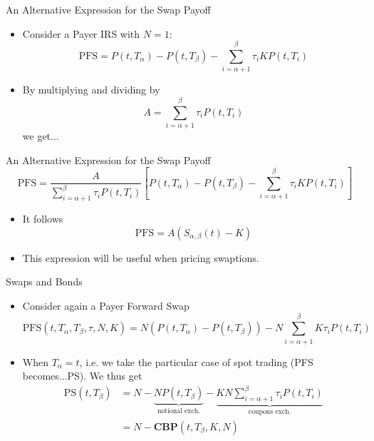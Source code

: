 \documentclass{beamer}
\begin{document}
\begin{frame}{An Alternative Expression for the Swap Payoff}
	\begin{itemize}
		\item Consider a Payer IRS with $N=1$:
		\begin{equation*}
			\text{PFS} = P(t,T_\alpha)-P(t,T_\beta)-\sum_{i=\alpha+1}^{\beta}\tau_iKP(t,T_i)
		\end{equation*}
		\item By multiplying and dividing by
		\begin{equation}
			A = \sum_{i=\alpha+1}^{\beta}\tau_iP(t, T_i)
		\end{equation}
		we get...
	\end{itemize}
\end{frame}

\begin{frame}{An Alternative Expression for the Swap Payoff}
	\begin{equation*}
		\text{PFS}=\frac{A}{\sum_{i=\alpha+1}^{\beta}\tau_iP(t, T_i)}\left[P(t,T_\alpha)-P(t,T_\beta)-\sum_{i=\alpha+1}^{\beta}\tau_iKP(t,T_i)\right]
	\end{equation*}
	\begin{itemize}
		\item It follows
		\begin{equation}
			\text{PFS}=A (S_{\alpha,\beta}(t)-K)
		\end{equation}
		\item This expression will be useful when pricing swaptions.
	\end{itemize}
\end{frame}

\begin{frame}{Swaps and Bonds}
	\begin{itemize}
		\item Consider again a Payer Forward Swap
		\begin{equation*}
			\text{PFS}(t,T_\alpha,T_\beta,\tau,N,K)=N(P(t,T_\alpha)-P(t,T_\beta))-N\sum_{i=\alpha+1}^{\beta} K\tau_iP(t,T_i)
		\end{equation*}
		\item When $T_\alpha = t$, i.e. we take the particular case of spot trading (PFS becomes...PS). We thus get
		\begin{equation*}
			\begin{aligned}
				\text{PS}(t,T_\beta) &=N-\underbrace{NP(t,T_\beta)}_{\text{notional exch.}}-\underbrace{KN\sum_{i=\alpha+1}^{\beta} \tau_iP(t,T_i)}_{\text{coupons exch.}} \\
				&=N-\textbf{CBP}(t,T_\beta,K,N)
			\end{aligned}
		\end{equation*}
	\end{itemize}
\end{frame}
\end{document}
